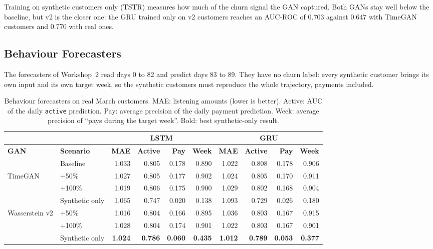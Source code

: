 \documentclass{article}
\begin{document}
Training on synthetic customers only (TSTR) measures how much of the churn signal the GAN captured. Both GANs stay well below the baseline, but v2 is the closer one: the GRU trained only on v2 customers reaches an AUC-ROC of 0.703 against 0.647 with TimeGAN customers and 0.770 with real ones.

\subsection{Behaviour Forecasters}

The forecasters of Workshop~2 read days 0 to 82 and predict days 83 to 89. They have no churn label: every synthetic customer brings its own input and its own target week, so the synthetic customers must reproduce the whole trajectory, payments included.

\begin{table}[H]
\centering
\renewcommand{\arraystretch}{1.3}
\begin{adjustbox}{max width=\textwidth}
\begin{tabular}{|l|l|rrrr|rrrr|}
\hline
 & & \multicolumn{4}{c|}{\textbf{LSTM}} & \multicolumn{4}{c|}{\textbf{GRU}} \\ \hline
\textbf{GAN} & \textbf{Scenario} & \textbf{MAE} & \textbf{Active} & \textbf{Pay} & \textbf{Week} & \textbf{MAE} & \textbf{Active} & \textbf{Pay} & \textbf{Week} \\ \hline
 & Baseline & 1.033 & 0.805 & 0.178 & 0.890 & 1.022 & 0.808 & 0.178 & 0.906 \\ \hline
\multirow{3}{*}{TimeGAN} & +50\% & 1.027 & 0.805 & 0.177 & 0.902 & 1.024 & 0.805 & 0.170 & 0.911 \\
 & +100\% & 1.019 & 0.806 & 0.175 & 0.900 & 1.029 & 0.802 & 0.168 & 0.904 \\
 & Synthetic only & 1.065 & 0.747 & 0.020 & 0.138 & 1.093 & 0.729 & 0.026 & 0.180 \\ \hline
\multirow{3}{*}{Wasserstein v2} & +50\% & 1.016 & 0.804 & 0.166 & 0.895 & 1.036 & 0.803 & 0.167 & 0.915 \\
 & +100\% & 1.028 & 0.804 & 0.174 & 0.901 & 1.022 & 0.803 & 0.167 & 0.901 \\
 & Synthetic only & \textbf{1.024} & \textbf{0.786} & \textbf{0.060} & \textbf{0.435} & \textbf{1.012} & \textbf{0.789} & \textbf{0.053} & \textbf{0.377} \\ \hline
\end{tabular}
\end{adjustbox}
\caption{Behaviour forecasters on real March customers. MAE: listening amounts (lower is better). Active: AUC of the daily \texttt{active} prediction. Pay: average precision of the daily payment prediction. Week: average precision of ``pays during the target week''. Bold: best synthetic-only result.}
\label{tab:w5_bridge_traj}
\end{table}
\end{document}
